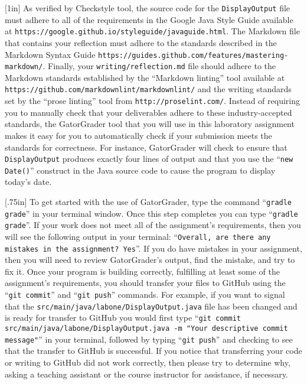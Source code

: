 \documentclass[11pt]{article}
\newcommand{\mainprogram}{\lstinline{DisplayOutput}}
\newcommand{\mainprogramsource}{\lstinline{src/main/java/labone/DisplayOutput.java}}
\newcommand{\reflection}{\lstinline{writing/reflection.md}}
\newcommand{\gatorgraderstart}{\command{gradle grade}}
\newcommand{\gatorgradercheck}{\command{gradle grade}}
\newcommand{\gitcommit}{\command{git commit}}
\newcommand{\gitpush}{\command{git push}}
\newcommand{\gitcommitmainprogram}{\command{git commit src/main/java/labone/DisplayOutput.java -m "Your
descriptive commit message"}}
\newcommand{\command}[1]{``\lstinline{#1}''}
\newcommand{\url}[1]{\lstinline{#1}}
\newcommand{\step}[1]{``{#1}''}
\newcommand{\caution}[1]{\null\hfill\LARGE{\faWarning{}}\newline\scriptsize{\em{#1}}}
\newcommand{\resource}[1]{\null\hfill\LARGE{\faLink{}}\newline\scriptsize{\em{#1}}}
\begin{document}
\marginnote{\resource{Study style guides}}[1in] As verified by Checkstyle
tool, the source code for the \mainprogram{} file must adhere to all of the
requirements in the Google Java Style Guide available at
\url{https://google.github.io/styleguide/javaguide.html}. The Markdown file
that contains your reflection must adhere to the standards described in the
Markdown Syntax Guide
\url{https://guides.github.com/features/mastering-markdown/}. Finally, your
\reflection{} file should adhere to the Markdown standards established by the
\step{Markdown linting} tool available at
\url{https://github.com/markdownlint/markdownlint/} and the writing standards
set by the \step{prose linting} tool from \url{http://proselint.com/}. Instead
of requiring you to manually check that your deliverables adhere to these
industry-accepted standards, the GatorGrader tool that you will use in this
laboratory assignment makes it easy for you to automatically check if your
submission meets the standards for correctness. For instance, GatorGrader will
check to ensure that \mainprogram{} produces exactly four lines of output and
that you use the \command{new Date()} construct in the Java source code to
cause the program to display today's date.

\marginnote{\caution{Write useful commits}}[.75in] To get started with the use of
GatorGrader, type the command \gatorgraderstart{} in your terminal window. Once
this step completes you can type \gatorgradercheck{}. If your work does not
meet all of the assignment's requirements, then you will see the following
output in your terminal: \command{Overall, are there any mistakes in the
assignment? Yes}. If you do have mistakes in your assignment, then you will
need to review GatorGrader's output, find the mistake, and try to fix it. Once
your program is building correctly, fulfilling at least some of the
assignment's requirements, you should transfer your files to GitHub using the
\gitcommit{} and \gitpush{} commands. For example, if you want to signal that
the \mainprogramsource{} file has been changed and is ready for transfer to
GitHub you would first type \gitcommitmainprogram{} in your terminal, followed
by typing \gitpush{} and checking to see that the transfer to GitHub is
successful. If you notice that transferring your code or writing to GitHub did
not work correctly, then please try to determine why, asking a teaching
assistant or the course instructor for assistance, if necessary.
\end{document}
